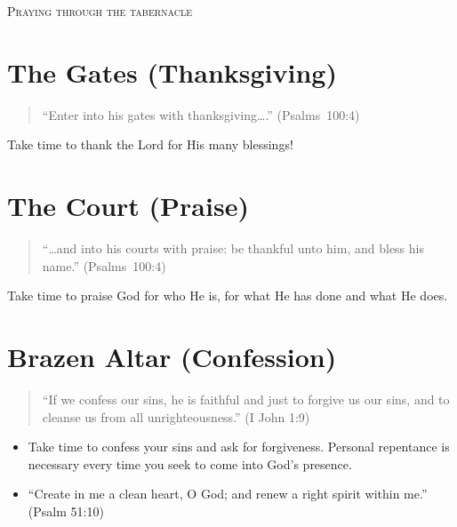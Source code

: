 \begin{center}
\mbox{}

\bigskip

\LARGE\textsc{Praying through the tabernacle}

\end{center}

\pagestyle{empty}
\setlength{\parindent}{0em}

\section{The Gates (Thanksgiving)}


\begin{quote}
    ``Enter into his gates with thanksgiving\ldots{}.'' (Psalms~100:4)
\end{quote}

Take time to thank the Lord for His many blessings!


\section{The Court (Praise)}

\begin{quote}
``\dots{}and into his courts with praise: be thankful unto him, and bless his name.'' (Psalms~100:4)
\end{quote}

Take time to praise God for who He is, for what He has done and what He does.



\section{Brazen Altar (Confession)}

\begin{quote}
``If we confess our sins, he is faithful and just to forgive us our sins,
    and to cleanse us from all unrighteousness.'' (I John 1:9)
\end{quote}

\begin{itemize}
\item Take time to confess your sins and ask for forgiveness.
    Personal repentance is necessary every time you seek to come into God’s presence.
\item ``Create in me a clean heart, O God; and renew a right spirit within me.'' (Psalm 51:10)
\end{itemize}


